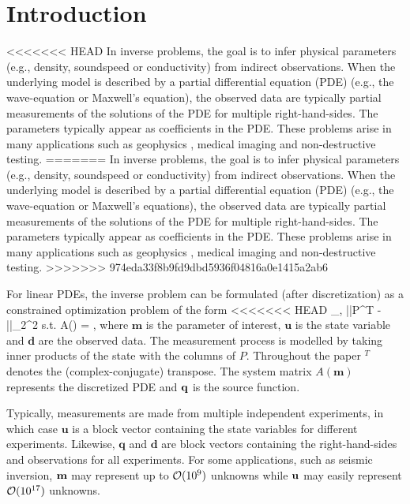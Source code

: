 \documentclass{iopart}
\begin{document}
{\maketitle

\section{Introduction}
<<<<<<< HEAD
In inverse problems, the goal is to infer physical parameters (e.g., density, soundspeed or conductivity) from indirect observations. When the underlying model is described by a partial differential equation (PDE) (e.g., the wave-equation or Maxwell's equation), the observed data are typically partial measurements of the solutions of the PDE for multiple right-hand-sides. The parameters typically appear as coefficients in the PDE. These problems arise in many applications such as geophysics \cite{Haber2004,Epanomeritakis08}, medical imaging \cite{Abdoulaev2005} and non-destructive testing.
=======
In inverse problems, the goal is to infer physical parameters (e.g., density, soundspeed or conductivity) from indirect observations. When the underlying model is described by a partial differential equation (PDE) (e.g., the wave-equation or Maxwell's equations), the observed data are typically partial measurements of the solutions of the PDE for multiple right-hand-sides. The parameters typically appear as coefficients in the PDE. These problems arise in many applications such as geophysics \cite{tarantola82,Haber2004,Epanomeritakis08,vanLeeuwen20133DFWI}, medical imaging \cite{Abdoulaev2005,Wang2015} and non-destructive testing.
>>>>>>> 974eda33f8b9fd9dbd5936f04816a0e1415a2ab6

For linear PDEs, the inverse problem can be formulated (after discretization) as a constrained optimization problem of the form
\bq
\label{eq:constr}
<<<<<<< HEAD
\min_{,} ||P^T - ||_2^2  \quad 
\mbox{s.t.} \quad A() = ,
\eq
where $\mathbf{m}$ is the parameter of interest, $\mathbf{u}$ is the state variable and $\mathbf{d}$ are the observed data. The measurement process is modelled by taking inner products of the state with the columns of $P$. Throughout the paper $^T$ denotes the (complex-conjugate) transpose. The system matrix $A(\mathbf{m})$ represents the discretized PDE and $\mathbf{q}$ is the source function. 

Typically, measurements are made from multiple independent experiments,
in which case $\mathbf{u}$ is a block vector containing the state variables for different experiments. Likewise, $\mathbf{q}$ and $\mathbf{d}$ are block vectors containing the right-hand-sides and observations for all experiments. For some applications, such as seismic inversion, $\mathbf{m}$ may represent up to $\mathcal{O}(10^9)$ unknowns while $\mathbf{u}$ may easily represent $\mathcal{O}(10^{17})$ unknowns.

}
\end{document}
